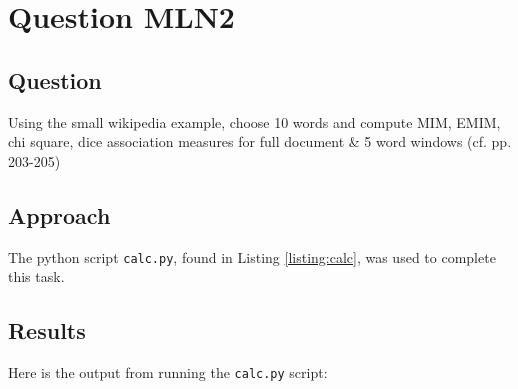 \section{Question MLN2}

\subsection{Question}
Using the small wikipedia example, choose 10 words and compute MIM, EMIM, chi square, dice association measures for full document \& 5 word windows (cf. pp. 203-205)

\subsection{Approach}
The python script \texttt{calc.py}, found in Listing \ref{listing:calc}, was used to complete this task.

\subsection{Results}
Here is the output from running the \texttt{calc.py} script:

